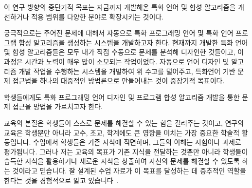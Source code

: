 \documentclass[11pt]{article}
\begin{document}
\begin{spacing}{1.145}
이 연구 방향의 중단기적 목표는 지금까지 개발해온 특화 언어 및 합성 알고리즘을 개선하거나 적용 범위를 다양한 분야로 확장시키는 것이다.
%

%
궁극적으로는 주어진 문제에 대해서 자동으로 특화 프로그래밍 언어 및 특화 언어 프로그램 합성 알고리즘을 생성하는 시스템을 개발하고자 한다.
%
%
현재까지 개발한 특화 언어 및 합성 알고리즘들은 모두 내가 직접 수동으로 문제를 분석해 디자인한 것들이고, 이 과정은 시간과 노력이 매우 많이 소모되는 작업이었다.
%
자동으로 언어 디자인 및 알고리즘 개발 작업을 수행하는 시스템을 개발하여 위 수고를 덜어주고, 특화언어 기반 문제 접근법을 하나의 대중적인 방법론으로 만들어내는 것이 중장기적 목표이다.



학생들에게도 특화 프로그래밍 언어 디자인 및 프로그램 합성 알고리즘 개발을 통한 문제 접근을 방법을 가르치고자 한다.
%








\clearpage
교육의 본질은 학생들이 스스로 문제를 해결할 수 있는 힘을 길러주는 것이고, 연구의 
%
교육은 학생뿐만 아니라 교수, 조교, 학계에도 큰 영향을 미치는 가장 중요한 학술적 활동입니다. 수업에서 학생들은 기존 지식에 직면하며, 그들의 이해는 시험이나 과제로 평가됩니다. 그러나 저는 교육의 목표가 기존 지식을 전달하는 것뿐만 아니라 학생들이 습득한 지식을 활용하거나 새로운 지식을 창출하여 자신의 문제를 해결할 수 있도록 하는 것이라고 믿습니다. 잘 설계된 수업 자료가 이 목표를 달성하는 데 중추적인 역할을 한다는 것을 경험적으로 알고 있습니다~\cite{JeJeChOh17}.



\end{spacing}


\end{document}
